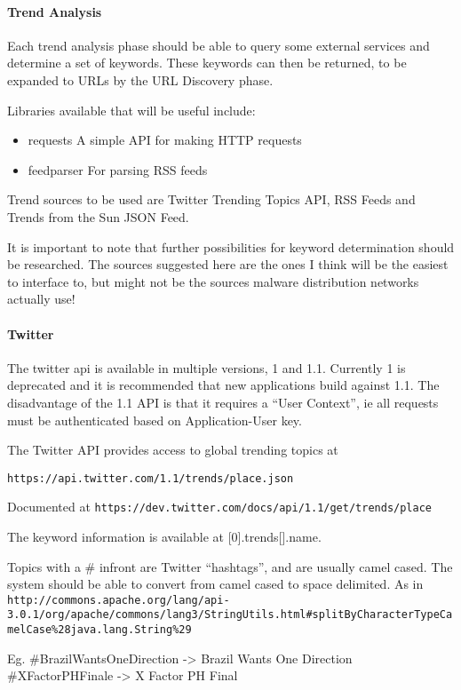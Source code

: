 \paragraph{Trend Analysis}
Each trend analysis phase should be able to query some external services and determine a set of keywords. These keywords can then be returned, to be expanded to URLs by the URL Discovery phase.

Libraries available that will be useful include:

\begin{itemize}
    \item requests A simple API for making HTTP requests
    \item feedparser For parsing RSS feeds
\end{itemize}

Trend sources to be used are Twitter Trending Topics API, RSS Feeds and Trends from the Sun JSON Feed.



It is important to note that further possibilities for keyword determination should be researched. The sources suggested here are the ones I think will be the easiest to interface to, but might not be the sources malware distribution networks actually use!

\paragraph{Twitter}
The twitter api is available in multiple versions, 1 and 1.1. Currently 1 is deprecated and it is recommended that new applications build against 1.1.  The disadvantage of the 1.1 API is that it requires a ``User Context'', ie all requests must be authenticated based on Application-User key.

The Twitter API provides access to global trending topics at

\verb`https://api.twitter.com/1.1/trends/place.json`

Documented at \verb`https://dev.twitter.com/docs/api/1.1/get/trends/place`

The keyword information is available at [0].trends[].name.

Topics with a \# infront are Twitter ``hashtags'', and are usually camel cased. The system should be able to convert from camel cased to space delimited. As in \verb`http://commons.apache.org/lang/api-3.0.1/org/apache/commons/lang3/StringUtils.html#splitByCharacterTypeCamelCase%28java.lang.String%29`

Eg. \#BrazilWantsOneDirection -> Brazil Wants One Direction
\#XFactorPHFinale -> X Factor PH Final

